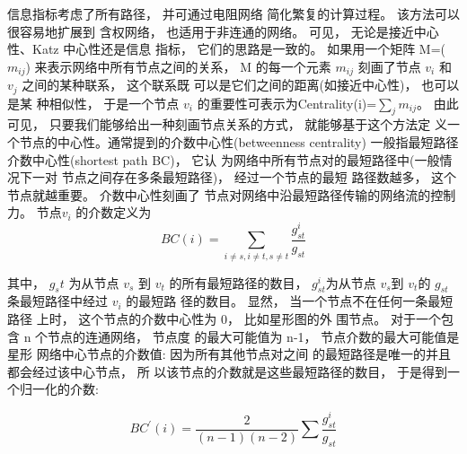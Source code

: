 				信息指标考虑了所有路径， 并可通过电阻网络 简化繁复的计算过程。 该方法可以很容易地扩展到 含权网络， 也适用于非连通的网络。
				可见， 无论是接近中心性、Katz 中心性还是信息 指标， 它们的思路是一致的。 如果用一个矩阵 M=($m_{ij}$) 来表示网络中所有节点之间的关系， M 的每一个元素 $m_{ij}$ 刻画了节点 $v_i$ 和 $v_j$ 之间的某种联系， 这个联系既 可以是它们之间的距离(如接近中心性)， 也可以是某 种相似性， 于是一个节点 $v_i$ 的重要性可表示为Centrality(i)=$\sum\limits_j {m_{ij}}$。 由此可见， 只要我们能够给出一种刻画节点关系的方式， 就能够基于这个方法定 义一个节点的中心性。通常提到的介数中心性(betweenness centrality) 一般指最短路径介数中心性(shortest path BC)， 它认 为网络中所有节点对的最短路径中(一般情况下一对 节点之间存在多条最短路径)， 经过一个节点的最短 路径数越多， 这个节点就越重要。 介数中心性刻画了 节点对网络中沿最短路径传输的网络流的控制力。 节点$v_i$ 的介数定义为
\[BC(i) = \sum\limits_{i \ne s,i \ne t,s \ne t} {\frac{{g_{st}^i}}{{{g_{st}}}}} \]

				其中， $g_st$ 为从节点 $v_s$ 到 $v_t$ 的所有最短路径的数目， $g_{st}^i$为从节点 $v_s$到 $v_t$的 $g_{st}$ 条最短路径中经过 $v_i$ 的最短路 径的数目。 显然， 当一个节点不在任何一条最短路径 上时， 这个节点的介数中心性为 0， 比如星形图的外 围节点。 对于一个包含 n 个节点的连通网络， 节点度 的最大可能值为 n-1， 节点介数的最大可能值是星形 网络中心节点的介数值: 因为所有其他节点对之间 的最短路径是唯一的并且都会经过该中心节点， 所 以该节点的介数就是这些最短路径的数目， 于是得到一个归一化的介数:

\[BC^{'}(i) = \frac{2}{{(n - 1)(n - 2)}}\sum {\frac{{g_{st}^i}}{{{g_{st}}}}} \]

